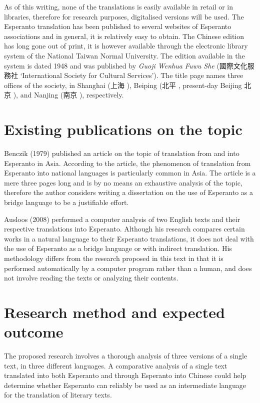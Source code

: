 As of this writing, none of the translations is easily available in retail or in libraries, therefore for research purposes, digitalised versions will be used.
The Esperanto translation has been published to several websites of Esperanto associations and in general, it is relatively easy to obtain.
The Chinese edition has long gone out of print, it is however available through the electronic library system of the National Taiwan Normal University.
The edition available in the system is dated 1948 and was published by \textit{Guoji Wenhua Fuwu She} (國際文化服務社  `International Society for Cultural Services').
The title page names three offices of the society, in Shanghai (上海 ), Beiping (北平 , present-day Beijing 北京 ), and Nanjing (南京 ), respectively.

\section{Existing publications on the topic}
Benczik (1979) published an article on the topic of translation from and into Esperanto in Asia.
According to the article, the phenomenon of translation from Esperanto into national languages is particularly common in Asia.
The article is a mere three pages long and is by no means an exhaustive analysis of the topic, therefore the author considers writing a dissertation on the use of Esperanto as a bridge language to be a justifiable effort.

Ausloos (2008) performed a computer analysis of two English texts and their respective translations into Esperanto.
Although his research compares certain works in a natural language to their Esperanto translations, it does not deal with the use of Esperanto as a bridge language or with indirect translation.
His methodology differs from the research proposed in this text in that it is performed automatically by a computer program rather than a human, and does not involve reading the texts or analyzing their contents.

\section{Research method and expected outcome}
The proposed research involves a thorough analysis of three versions of a single text, in three different languages.
A comparative analysis of a single text translated into both Esperanto and through Esperanto into Chinese could help determine whether Esperanto can reliably be used as an intermediate language for the translation of literary texts.

